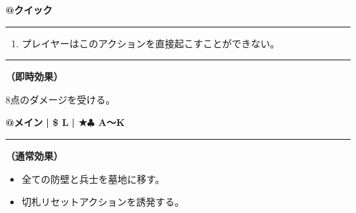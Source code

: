 \documentclass[twocolumn,a5paper,papersize,10pt]{jarticle}
\begin{document}
\begin{tcolorbox}[title={\small\bf【Action】前触れ}{\scriptsize （誘発）}]

{\scriptsize\bf @クイック }

\vspace{1mm} %
\hrule height 0.1mm depth 0mm width 62mm %
\vspace{1mm} %


\vspace{-1zh}%
\begin{enumerate}
\renewcommand{\labelenumi}{※}
\setlength{\leftskip}{-0.3cm}
\setlength{\itemsep}{0pt} %
\setlength{\parskip}{0pt} %

\item プレイヤーはこのアクションを直接起こすことができない。

\vspace{-3mm}%
\end{enumerate}
\vspace{-2mm} %
\vspace{1zh}%
\vspace{1mm} %
\hrule height 0.1mm depth 0mm width 62mm %
\vspace{1mm} %

{\bf（即時効果）}

8点のダメージを受ける。

\vspace{1mm} %
\end{tcolorbox}

\vspace{-1zh}
\begin{tcolorbox}[title={\small\bf【Action】リセット}{\scriptsize （通常魔法）}]

{\scriptsize\bf @メイン }
  {\scriptsize\bf | \$ L }
  {\scriptsize\bf | ★{\normalsize $\clubsuit$} A〜K}

\vspace{1mm} %
\hrule height 0.1mm depth 0mm width 62mm %
\vspace{1mm} %

{\bf（通常効果）}


\vspace{-1zh}%
\begin{itemize}
\setlength{\leftskip}{-0.3cm}
\setlength{\parskip}{0pt} %

\item 全ての防壁と兵士を墓地に移す。

\item 切札リセットアクションを誘発する。
\vspace{-1zh}%
\end{itemize}

\vspace{1mm} %
\end{tcolorbox}
\end{document}
